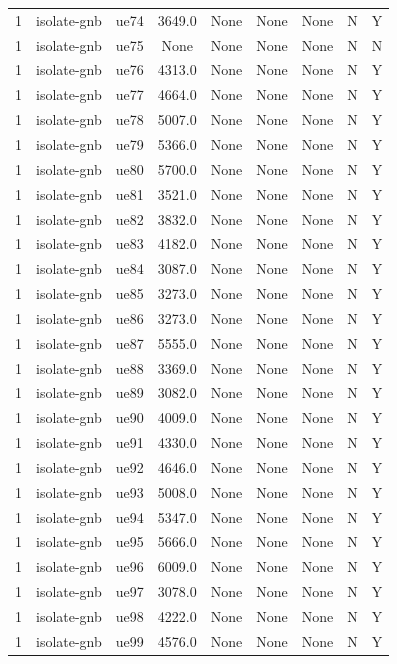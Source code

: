 \begin{table}[ht]
\begin{tabular}{|c|c|c|c|c|c|c|c|c|}
1 & isolate-gnb & ue74 & 3649.0 & None & None & None & N & Y \\
1 & isolate-gnb & ue75 & None & None & None & None & N & N \\
1 & isolate-gnb & ue76 & 4313.0 & None & None & None & N & Y \\
1 & isolate-gnb & ue77 & 4664.0 & None & None & None & N & Y \\
1 & isolate-gnb & ue78 & 5007.0 & None & None & None & N & Y \\
1 & isolate-gnb & ue79 & 5366.0 & None & None & None & N & Y \\
1 & isolate-gnb & ue80 & 5700.0 & None & None & None & N & Y \\
1 & isolate-gnb & ue81 & 3521.0 & None & None & None & N & Y \\
1 & isolate-gnb & ue82 & 3832.0 & None & None & None & N & Y \\
1 & isolate-gnb & ue83 & 4182.0 & None & None & None & N & Y \\
1 & isolate-gnb & ue84 & 3087.0 & None & None & None & N & Y \\
1 & isolate-gnb & ue85 & 3273.0 & None & None & None & N & Y \\
1 & isolate-gnb & ue86 & 3273.0 & None & None & None & N & Y \\
1 & isolate-gnb & ue87 & 5555.0 & None & None & None & N & Y \\
1 & isolate-gnb & ue88 & 3369.0 & None & None & None & N & Y \\
1 & isolate-gnb & ue89 & 3082.0 & None & None & None & N & Y \\
1 & isolate-gnb & ue90 & 4009.0 & None & None & None & N & Y \\
1 & isolate-gnb & ue91 & 4330.0 & None & None & None & N & Y \\
1 & isolate-gnb & ue92 & 4646.0 & None & None & None & N & Y \\
1 & isolate-gnb & ue93 & 5008.0 & None & None & None & N & Y \\
1 & isolate-gnb & ue94 & 5347.0 & None & None & None & N & Y \\
1 & isolate-gnb & ue95 & 5666.0 & None & None & None & N & Y \\
1 & isolate-gnb & ue96 & 6009.0 & None & None & None & N & Y \\
1 & isolate-gnb & ue97 & 3078.0 & None & None & None & N & Y \\
1 & isolate-gnb & ue98 & 4222.0 & None & None & None & N & Y \\
1 & isolate-gnb & ue99 & 4576.0 & None & None & None & N & Y \\

\end{tabular}
\end{table}
